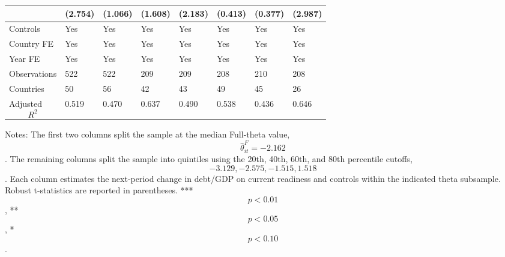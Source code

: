 \begin{table}[H]
\begin{threeparttable}
\begin{tabularx}{\textwidth}{lYYYYYYY}
  & (2.754) & (1.066) & (1.608) & (2.183) & (0.413) & (0.377) & (2.987) \\
\midrule
Controls & Yes & Yes & Yes & Yes & Yes & Yes & Yes \\
Country FE & Yes & Yes & Yes & Yes & Yes & Yes & Yes \\
Year FE & Yes & Yes & Yes & Yes & Yes & Yes & Yes \\
Observations & 522 & 522 & 209 & 209 & 208 & 210 & 208 \\
Countries & 50 & 56 & 42 & 43 & 49 & 45 & 26 \\
Adjusted $$R^2$$ & 0.519 & 0.470 & 0.637 & 0.490 & 0.538 & 0.436 & 0.646 \\
\bottomrule
\end{tabularx}
\begin{tablenotes}[flushleft]\footnotesize
\item Notes: The first two columns split the sample at the median Full-theta value, $$\widehat{\theta}^{F}_{it}=-2.162$$. The remaining columns split the sample into quintiles using the 20th, 40th, 60th, and 80th percentile cutoffs, $$-3.129, -2.575, -1.515, 1.518$$. Each column estimates the next-period change in debt/GDP on current readiness and controls within the indicated theta subsample. Robust t-statistics are reported in parentheses. *** $$p<0.01$$, ** $$p<0.05$$, * $$p<0.10$$.
\end{tablenotes}
\end{threeparttable}
\end{table}
